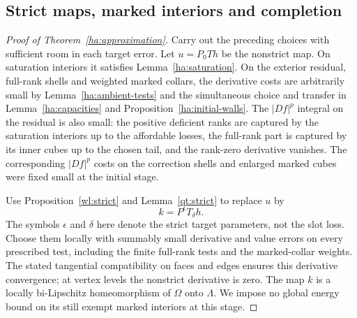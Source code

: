 \subsection{Strict maps, marked interiors and completion}
\label{ha:completion}

\begin{proof}[Proof of Theorem~\ref{ha:approximation}]
Carry out the preceding choices with sufficient room in each target
error.  Let $u=P_0Th$ be the nonstrict map.  On saturation interiors
it satisfies Lemma~\ref{ha:saturation}.  On the exterior residual,
full-rank shells and weighted marked collars, the derivative costs
are arbitrarily small by Lemma~\ref{ha:ambient-tests} and the
simultaneous choice and transfer in Lemma~\ref{ha:capacities} and
Proposition~\ref{ha:initial-walls}.  The $|Df|^p$
integral on the residual is also small: the positive deficient ranks
are captured by the saturation interiors up to the affordable
losses, the full-rank part is captured by its inner cubes up to the
chosen tail, and the rank-zero derivative vanishes.  The corresponding
$|Df|^p$ costs on the correction shells and enlarged marked cubes
were fixed small at the initial stage.

Use Proposition~\ref{wl:strict} and Lemma~\ref{qt:strict} to
replace $u$ by
\[
                            k=P^\epsilon T_\delta h.
\]
The symbols $\epsilon$ and $\delta$ here denote the strict target
parameters, not the slot loss.  Choose them locally with summably
small derivative and value errors on every prescribed test, including
the finite full-rank tests and the marked-collar weights.  The stated
tangential compatibility on faces and edges ensures this derivative
convergence; at vertex levels the nonstrict derivative is zero.
The map $k$ is a locally bi-Lipschitz homeomorphism of $\Omega$ onto
$\Lambda$.  We impose no global energy bound on its still exempt
marked interiors at this stage.


\end{proof}
